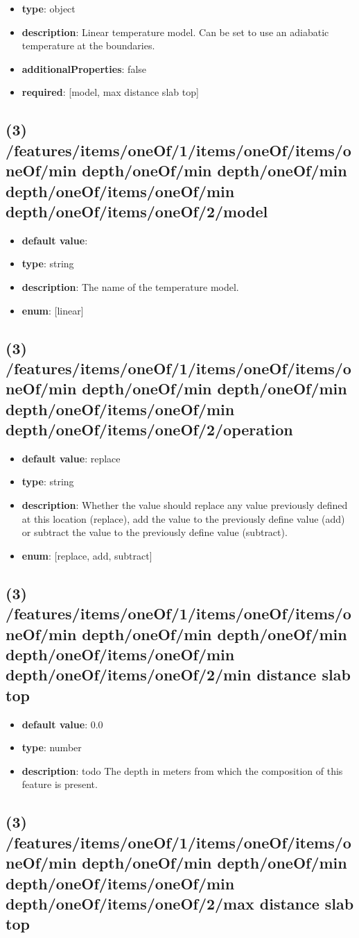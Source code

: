 \begin{itemize}[leftmargin=2em]\item {\bf type}: object
\item {\bf description}: Linear temperature model. Can be set to use an adiabatic temperature at the boundaries.
\item {\bf additionalProperties}: false
\item {\bf required}: [model, max distance slab top]\end{itemize}
\subsection{(3) /features/items/oneOf/1/items/oneOf/items/oneOf/min depth/oneOf/min depth/oneOf/min depth/oneOf/items/oneOf/min depth/oneOf/items/oneOf/2/model}
\begin{itemize}[leftmargin=3em]\item {\bf default value}: 
\item {\bf type}: string
\item {\bf description}: The name of the temperature model.
\item {\bf enum}: [linear]\end{itemize}\subsection{(3) /features/items/oneOf/1/items/oneOf/items/oneOf/min depth/oneOf/min depth/oneOf/min depth/oneOf/items/oneOf/min depth/oneOf/items/oneOf/2/operation}
\begin{itemize}[leftmargin=3em]\item {\bf default value}: replace
\item {\bf type}: string
\item {\bf description}: Whether the value should replace any value previously defined at this location (replace), add the value to the previously define value (add) or subtract the value to the previously define value (subtract).
\item {\bf enum}: [replace, add, subtract]\end{itemize}\subsection{(3) /features/items/oneOf/1/items/oneOf/items/oneOf/min depth/oneOf/min depth/oneOf/min depth/oneOf/items/oneOf/min depth/oneOf/items/oneOf/2/min distance slab top}
\begin{itemize}[leftmargin=3em]\item {\bf default value}: 0.0
\item {\bf type}: number
\item {\bf description}: todo The depth in meters from which the composition of this feature is present.
\end{itemize}\subsection{(3) /features/items/oneOf/1/items/oneOf/items/oneOf/min depth/oneOf/min depth/oneOf/min depth/oneOf/items/oneOf/min depth/oneOf/items/oneOf/2/max distance slab top}
